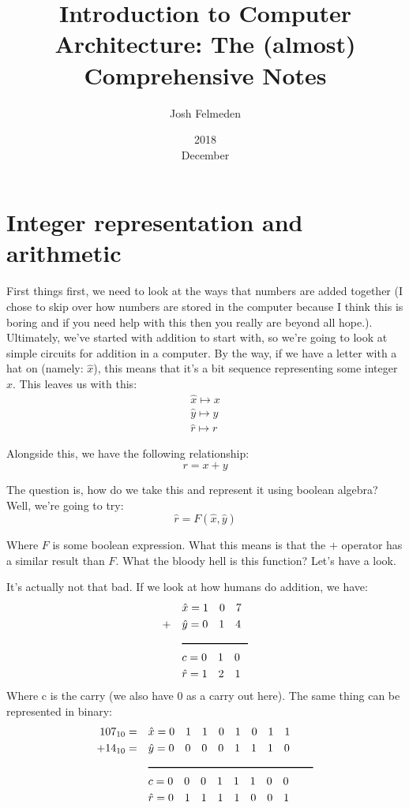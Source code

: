\documentclass[11pt,a4paper,titlepage,dvipsnames,cmyk]{scrartcl}
\title{Introduction to Computer Architecture: The (almost) Comprehensive
Notes}
\date{2018\\ December}
\author{Josh Felmeden}
\begin{document}
\maketitle

\tableofcontents
\newpage

\section{Integer representation and arithmetic}%
\label{sec:reallyboring}
First things first, we need to look at the ways that numbers are added together
(I chose to skip over how numbers are stored in the computer because I think
this is boring and if you need help with this then you really are beyond all
hope.). Ultimately, we've started with addition to start with, so we're going to
look at simple circuits for addition in a computer. By the way, if we have a
letter with a hat on (namely: $\hat x$), this means that it's a bit sequence
representing some integer $x$. This leaves us with this:
\begin{align*}
    \hat x \mapsto x \\
    \hat y \mapsto y \\
    \hat r \mapsto r
\end{align*}

Alongside this, we have the following relationship:
\begin{equation}
    r = x + y
\end{equation}

The question is, how do we take this and represent it using boolean algebra?
Well, we're going to try:
\begin{equation}
    \hat r = F(\hat x, \hat y)
\end{equation}

Where $F$ is some boolean expression. What this means is that the $+$ operator
has a similar result than $F$. What the bloody hell is this function? Let's have
a look.

It's actually not that bad. If we look at how humans do addition, we have:
\begin{align*}
    &\hat x = 1 \quad 0 \quad 7 \\
    + \quad &\hat y = 0 \quad 1 \quad 4 \\
        &\rule{60pt}{1pt} \\
           &c = 0 \quad 1 \quad 0 \\
           &\hat r = 1 \quad 2 \quad 1
\end{align*}
Where c is the carry (we also have 0 as a carry out here). The same thing can be
represented in binary:
\begin{align*}
    107_{10} = \quad &\hat x = 0 \quad 1 \quad 1 \quad 0 \quad 1 \quad 0 \quad 1 \quad
    1 \\
    + 14_{10} = \quad &\hat y = 0 \quad 0 \quad 0 \quad 0 \quad 1 \quad 1 \quad 1
    \quad 0 \\
      &\rule{150pt}{1pt} \\
      &c = 0 \quad 0 \quad 0 \quad 1 \quad 1 \quad 1 \quad 0 \quad 0 \\
      &\hat r = 0 \quad 1 \quad 1 \quad 1 \quad 1 \quad 0 \quad 0 \quad 1
\end{align*}
\end{document}
